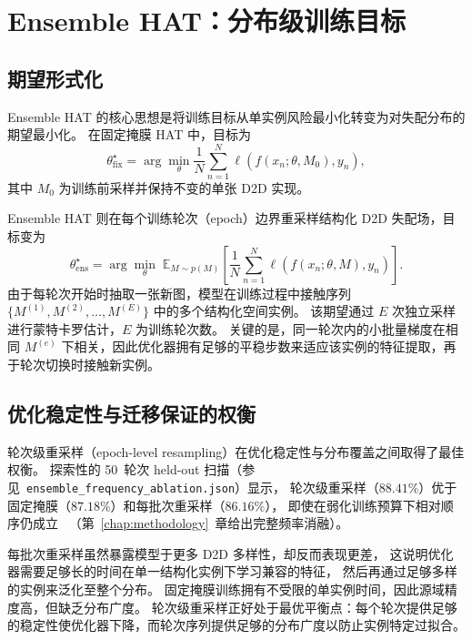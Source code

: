 \section{Ensemble HAT：分布级训练目标}

\subsection{期望形式化}

Ensemble HAT 的核心思想是将训练目标从单实例风险最小化转变为对失配分布的期望最小化。
在固定掩膜 HAT 中，目标为
\begin{equation}
    \theta_{\mathrm{fix}}^{\star}=\arg\min_{\theta}\frac{1}{N}\sum_{n=1}^{N}\ell\!\left(f(x_{n};\theta,M_{0}),y_{n}\right),
\label{eq:hat-fixed-ch1}
\end{equation}
其中 $M_0$ 为训练前采样并保持不变的单张 D2D 实现。

Ensemble HAT 则在每个训练轮次（epoch）边界重采样结构化 D2D 失配场，目标变为
\begin{equation}
    \theta_{\mathrm{ens}}^{\star}=\arg\min_{\theta}\;\mathbb{E}_{M\sim p(M)}\!\left[\frac{1}{N}\sum_{n=1}^{N}\ell\!\left(f(x_{n};\theta,M),y_{n}\right)\right].
\label{eq:hat-ensemble-ch1}
\end{equation}
由于每轮次开始时抽取一张新图，模型在训练过程中接触序列 $\{M^{(1)},M^{(2)},\dots,M^{(E)}\}$ 中的多个结构化空间实例。
该期望通过 $E$ 次独立采样进行蒙特卡罗估计，$E$ 为训练轮次数。
关键的是，同一轮次内的小批量梯度在相同 $M^{(e)}$ 下相关，因此优化器拥有足够的平稳步数来适应该实例的特征提取，再于轮次切换时接触新实例。

\subsection{优化稳定性与迁移保证的权衡}

轮次级重采样（epoch-level resampling）在优化稳定性与分布覆盖之间取得了最佳权衡。
探索性的 50~轮次 held-out 扫描（参见~\texttt{ensemble\_frequency\_ablation.json}）显示，
轮次级重采样（$88.41\%$）优于固定掩膜（$87.18\%$）和每批次重采样（$86.16\%$），
即使在弱化训练预算下相对顺序仍成立~
（第~\ref{chap:methodology}~章给出完整频率消融）。

每批次重采样虽然暴露模型于更多 D2D 多样性，却反而表现更差，
这说明优化器需要足够长的时间在单一结构化实例下学习兼容的特征，
然后再通过足够多样的实例来泛化至整个分布。
固定掩膜训练拥有不受限的单实例时间，因此源域精度高，但缺乏分布广度。
轮次级重采样正好处于最优平衡点：每个轮次提供足够的稳定性使优化器下降，而轮次序列提供足够的分布广度以防止实例特定过拟合。

